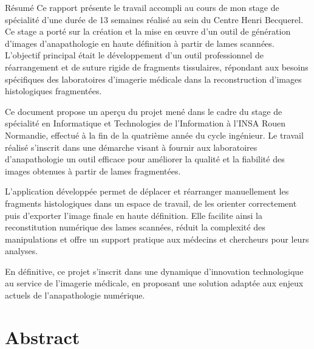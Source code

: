 \documentclass[11pt,a4paper]{report}
\begin{document}
\begin{resume}{Résumé}
Ce rapport présente le travail accompli au cours de mon stage de spécialité d'une durée de 13 semaines réalisé au sein du Centre Henri Becquerel. Ce stage a porté sur la création et la mise en œuvre d'un outil de génération d'images d'anapathologie en haute définition à partir de lames scannées. L'objectif principal était le développement d'un outil professionnel de réarrangement et de suture rigide de fragments tissulaires, répondant aux besoins spécifiques des laboratoires d'imagerie médicale dans la reconstruction d'images histologiques fragmentées.

Ce document propose un aperçu du projet mené dans le cadre du stage de spécialité en Informatique et Technologies de l'Information à l'INSA Rouen Normandie, effectué à la fin de la quatrième année du cycle ingénieur. Le travail réalisé s'inscrit dans une démarche visant à fournir aux laboratoires d'anapathologie un outil efficace pour améliorer la qualité et la fiabilité des images obtenues à partir de lames fragmentées.

L'application développée permet de déplacer et réarranger manuellement les fragments histologiques dans un espace de travail, de les orienter correctement puis d'exporter l'image finale en haute définition. Elle facilite ainsi la reconstitution numérique des lames scannées, réduit la complexité des manipulations et offre un support pratique aux médecins et chercheurs pour leurs analyses.

En définitive, ce projet s'inscrit dans une dynamique d'innovation technologique au service de l'imagerie médicale, en proposant une solution adaptée aux enjeux actuels de l'anapathologie numérique.
\end{resume}

\chapter*{Abstract}
\end{document}
